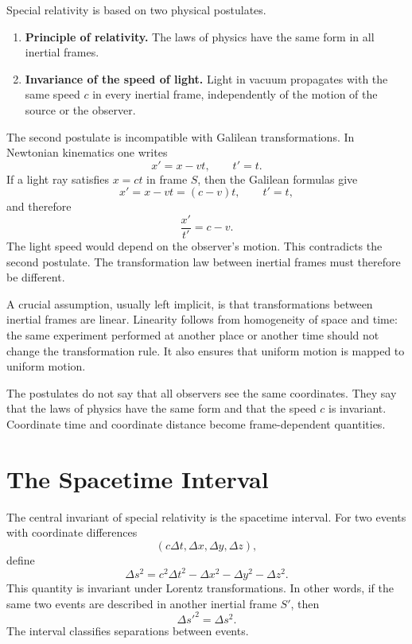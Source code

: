 Special relativity is based on two physical postulates.

\begin{enumerate}
    \item \textbf{Principle of relativity.}  The laws of physics have the same
    form in all inertial frames.
    \item \textbf{Invariance of the speed of light.}  Light in vacuum propagates
    with the same speed \(c\) in every inertial frame, independently of the
    motion of the source or the observer.
\end{enumerate}

The second postulate is incompatible with Galilean transformations.  In
Newtonian kinematics one writes
\[
x'=x-vt,
\qquad
 t'=t.
\]
If a light ray satisfies \(x=ct\) in frame \(S\), then the Galilean formulas give
\[
x'=x-vt=(c-v)t,
\qquad
 t'=t,
\]
and therefore
\[
\frac{x'}{t'}=c-v.
\]
The light speed would depend on the observer's motion.  This contradicts the
second postulate.  The transformation law between inertial frames must therefore
be different.

A crucial assumption, usually left implicit, is that transformations between
inertial frames are linear.  Linearity follows from homogeneity of space and
time: the same experiment performed at another place or another time should not
change the transformation rule.  It also ensures that uniform motion is mapped
to uniform motion.

\begin{remarkbox}
The postulates do not say that all observers see the same coordinates.  They say
that the laws of physics have the same form and that the speed \(c\) is
invariant.  Coordinate time and coordinate distance become frame-dependent
quantities.
\end{remarkbox}

\clearpage

\section{The Spacetime Interval}

The central invariant of special relativity is the spacetime interval.  For two
events with coordinate differences
\[
( c\Delta t,\Delta x,\Delta y,\Delta z),
\]
define
\[
\Delta s^2=c^2\Delta t^2-\Delta x^2-\Delta y^2-\Delta z^2.
\]
This quantity is invariant under Lorentz transformations.  In other words, if
the same two events are described in another inertial frame \(S'\), then
\[
\Delta s'^2=\Delta s^2.
\]
The interval classifies separations between events.

